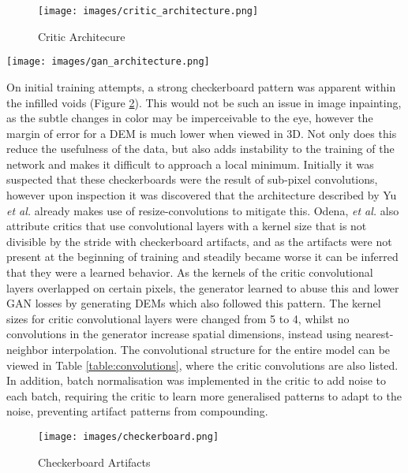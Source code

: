 \documentclass[twocolumn]{article}
\begin{document}
\begin{figure}[htbp]
\centering
\texttt{[image: images/critic\_architecture.png]}
\caption{\label{fig:critic}Critic Architecure}
\end{figure}

\begin{figure*}
\centering
\texttt{[image: images/gan\_architecture.png]}
\caption{\label{fig:generator}Generator Architecure}
\end{figure*}

On initial training attempts, a strong checkerboard pattern was apparent within the infilled voids (Figure \ref{fig:checkerboard}).
This would not be such an issue in image inpainting, as the subtle changes in color may be imperceivable to the eye, however the margin of error for a DEM is much lower when viewed in 3D.
Not only does this reduce the usefulness of the data, but also adds instability to the training of the network and makes it difficult to approach a local minimum.
Initially it was suspected that these checkerboards were the result of sub-pixel convolutions\autocite{aitkenCheckerboardArtifactFree2017}, however upon inspection it was discovered that the architecture described by Yu \emph{et al.} already makes use of resize-convolutions\autocite{odenaDeconvolutionCheckerboardArtifacts2016} to mitigate this.
Odena, \emph{et al.}\autocite{odenaDeconvolutionCheckerboardArtifacts2016} also attribute critics that use convolutional layers with a kernel size that is not divisible by the stride with checkerboard artifacts, and as the artifacts were not present at the beginning of training and steadily became worse it can be inferred that they were a learned behavior.
As the kernels of the critic convolutional layers overlapped on certain pixels, the generator learned to abuse this and lower GAN losses by generating DEMs which also followed this pattern.
The kernel sizes for critic convolutional layers were changed from 5 to 4, whilst no convolutions in the generator increase spatial dimensions, instead using nearest-neighbor interpolation.
The convolutional structure for the entire model can be viewed in Table \ref{table:convolutions}, where the critic convolutions are also listed.
In addition, batch normalisation was implemented in the critic to add noise to each batch, requiring the critic to learn more generalised patterns to adapt to the noise, preventing artifact patterns from compounding.

\begin{figure}[htbp]
\centering
\texttt{[image: images/checkerboard.png]}
\caption{\label{fig:checkerboard}Checkerboard Artifacts}
\end{figure}
\end{document}
